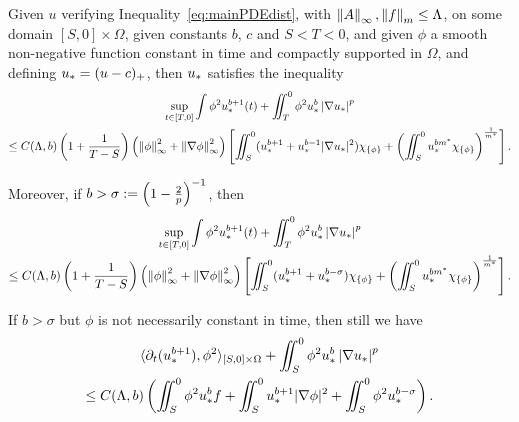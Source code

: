 \begin{lemma} \label{th:Energy} \label{th:alt_Energy}
Given $u$ verifying Inequality~\eqref{eq:mainPDEdist}, with $\left\lVert A\right\rVert_{\infty},\left\lVert f\right\rVert_m \leq \Lambda$, on some domain $[S,0]\times\Omega$, given constants $b$, $c$ and $S < T < 0$, and given $\phi$ a smooth non-negative function constant in time and compactly supported in $\Omega$, and defining $u_* = (u-c)_+$, then $u_*$ satisfies the inequality
%
\begin{equation} \begin{gathered} \label{energy_1}
\sup_{t \in [T,0]} \int \phi^2 u_*^{b+1}(t) + \iint_T^0 \phi^2 u_*^b \left\lvert \nabla u_* \right\rvert^p \\
\leq C(\Lambda, b) \left( 1+\frac{1}{T-S} \right) \left( \left\lVert\phi\right\rVert_\infty^2 + \left\lVert\nabla \phi\right\rVert_\infty^2 \right) \left[  \iint_S^0 (u_*^{b+1} + u_*^{b-1}|\nabla u_*|^2) \chi_{\{\phi\}} + \left( \iint_S^0 u_*^{b m^\ast} \chi_{\{\phi\}} \right)^\frac{1}{m^\ast}  \right]. 
\end{gathered} \end{equation}

Moreover, if $b > \sigma := \left( 1-\frac{2}{p} \right)^{-1}$, then
\begin{equation} \begin{gathered} \label{energy_2}
\sup_{t \in [T,0]} \int \phi^2 u_*^{b+1}(t) + \iint_T^0 \phi^2 u_*^b \left\lvert \nabla u_* \right\rvert^p \\
\leq C(\Lambda, b) \left( 1+\frac{1}{T-S} \right) \left( \left\lVert\phi\right\rVert_\infty^2 + \left\lVert\nabla \phi\right\rVert_\infty^2 \right) \left[  \iint_S^0 (u_*^{b+1} + u_*^{b-\sigma}) \chi_{\{\phi\}} + \left( \iint_S^0 u_*^{b m^\ast} \chi_{\{\phi\}} \right)^\frac{1}{m^\ast}  \right].
\end{gathered} \end{equation}

If $b > \sigma$ but $\phi$ is not necessarily constant in time, then still we have
\begin{equation} \begin{gathered} \label{energy_3}
\langle \partial_t(u_*^{b+1}),\phi^2 \rangle_{[S,0]\times\Omega} + \iint_{S}^0 \phi^2 u_*^b \left\lvert \nabla u_* \right\rvert^p \\
\leq C(\Lambda,b) \left(  \iint_{S}^0 \phi^2 u_*^b f + \iint_{S}^0 u_*^{b+1} |\nabla \phi|^2 + \iint_{S}^0 \phi^2 u_*^{b-\sigma}  \right). 
\end{gathered} \end{equation}


\end{lemma}

